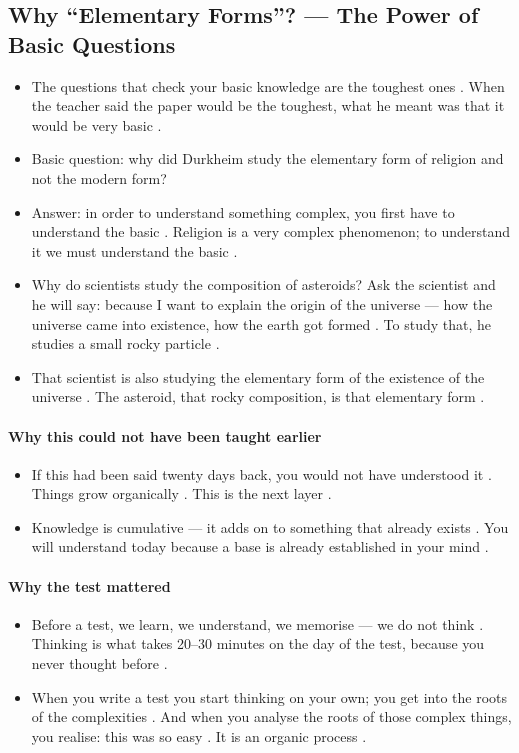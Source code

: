 \subsection{Why ``Elementary Forms''? --- The Power of Basic Questions}
\begin{itemize}
    \item The questions that check your basic knowledge are the toughest ones . When the teacher said the paper would be the toughest, what he meant was that it would be very basic .
    \item Basic question: why did Durkheim study the elementary form of religion and not the modern form? 
    \item Answer: in order to understand something complex, you first have to understand the basic . Religion is a very complex phenomenon; to understand it we must understand the basic .
\end{itemize}

\begin{ExampleBox}
\begin{itemize}
    \item Why do scientists study the composition of asteroids? Ask the scientist and he will say: because I want to explain the origin of the universe --- how the universe came into existence, how the earth got formed . To study that, he studies a small rocky particle .
    \item That scientist is also studying the elementary form of the existence of the universe . The asteroid, that rocky composition, is that elementary form .
\end{itemize}
\end{ExampleBox}

\paragraph{Why this could not have been taught earlier}
\begin{itemize}
    \item If this had been said twenty days back, you would not have understood it . Things grow organically . This is the next layer .
    \item Knowledge is cumulative --- it adds on to something that already exists . You will understand today because a base is already established in your mind .
\end{itemize}

\paragraph{Why the test mattered}
\begin{itemize}
    \item Before a test, we learn, we understand, we memorise --- we do not think . Thinking is what takes 20--30 minutes on the day of the test, because you never thought before .
    \item When you write a test you start thinking on your own; you get into the roots of the complexities . And when you analyse the roots of those complex things, you realise: this was so easy . It is an organic process .
\end{itemize}

